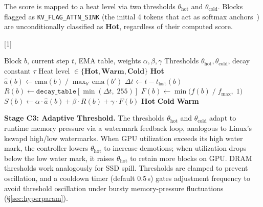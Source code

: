 \documentclass[conference]{IEEEtran}
\begin{document}
The score is mapped to a heat level via two thresholds $\theta_{\text{hot}}$ and $\theta_{\text{cold}}$. Blocks flagged as \texttt{KV\_FLAG\_ATTN\_SINK} (the initial 4 tokens that act as softmax anchors~\cite{streamingllm}) are unconditionally classified as \textbf{Hot}, regardless of their computed score.

\begin{algorithm}[t]
\caption{Per-Block Hot-Cold Classification (C1+C2)}
\label{alg:classify}
\algrenewcommand{\alglinenumber}[1]{}
\begin{algorithmic}
\Require Block $b$, current step $t$, EMA table, weights $\alpha, \beta, \gamma$
\Require Thresholds $\theta_{\text{hot}}, \theta_{\text{cold}}$, decay constant $\tau$
\Ensure Heat level $\in \{\textbf{Hot}, \textbf{Warm}, \textbf{Cold}\}$
\Statex
{} 
    \State \Return \textbf{Hot}
\EndIf
\Statex
\State $\hat{a}(b) \gets \text{ema}(b) \;/\; \max_{b'} \text{ema}(b')$ 
\State $\Delta t \gets t - t_{\text{last}}(b)$ 
\State $R(b) \gets \texttt{decay\_table}[\min(\Delta t,\; 255)]$ 
\State $F(b) \gets \min\bigl(f(b) \;/\; f_{\max},\; 1\bigr)$ 
\Statex
\State $S(b) \gets \alpha \cdot \hat{a}(b) + \beta \cdot R(b) + \gamma \cdot F(b)$ 
\Statex
{}
    \State \Return \textbf{Hot} 
    \State \Return \textbf{Cold} 
\Else
    \State \Return \textbf{Warm} 
\EndIf
\end{algorithmic}
\end{algorithm}

\textbf{Stage C3: Adaptive Threshold.} The thresholds $\theta_{\text{hot}}$ and $\theta_{\text{cold}}$ adapt to runtime memory pressure via a watermark feedback loop, analogous to Linux's kswapd high/low watermarks. When GPU utilization exceeds its high water mark, the controller lowers $\theta_{\text{hot}}$ to increase demotions; when utilization drops below the low water mark, it raises $\theta_{\text{hot}}$ to retain more blocks on GPU. DRAM thresholds work analogously for SSD spill. Thresholds are clamped to prevent oscillation, and a cooldown timer (default 0.5\,s) gates adjustment frequency to avoid threshold oscillation under bursty memory-pressure fluctuations (\S\ref{sec:hyperparam}).
\end{document}

